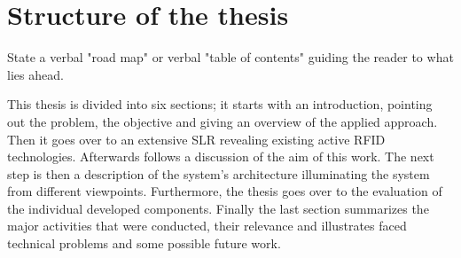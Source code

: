 \section{Structure of the thesis}
\label{sec:StructureOfTheThesis}

State a verbal "road map" or verbal "table of contents" guiding the reader to
what lies ahead.

This thesis is divided into six sections; it starts with an introduction, pointing
out the problem, the objective and giving an overview of the applied approach.
Then it goes over to an extensive SLR revealing existing active RFID technologies.
Afterwards follows a discussion of the aim of this work. The next step
is then a description of the system's architecture illuminating the system from
different viewpoints. Furthermore, the thesis goes over to the evaluation of the
individual developed components. Finally the last section summarizes the major
activities that were conducted, their relevance and illustrates faced technical
problems and some possible future work.